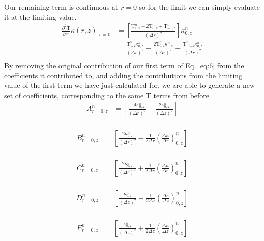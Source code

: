 \documentclass[12pt]{article}
\begin{document}
      Our remaining term is continuous at $r=0$ so for the limit we can simply evaluate it at the limiting value.
      \begin{equation}
        \begin{aligned}
          \frac{\partial^2\mathrm{T}}{\partial r^2}\kappa(r, z)\rvert_{r=0} &= \left [\frac{\mathrm{T}^{n}_{1, z}  - 2 \mathrm{T}^{n}_{0, z} +  \mathrm{T}^{n}_{-1, z}}{(\Delta r)^2} \right ] \kappa^n_{0, z} \\
           &= \frac{\mathrm{T}^n_{1, z}\kappa^n_{0, z}}{(\Delta r)^2} - \frac{2 \mathrm{T}^n_{0, z}\kappa^n_{0,z}}{(\Delta r)^2} + \frac{\mathrm{T}^n_{- 1, z}\kappa^n_{0,z}}{(\Delta r)^2}\\
        \end{aligned}
      \end{equation}
    By removing the original contribution of our first term of Eq. \ref{eq:6} from the coefficients it contributed to, and adding the contributions from the limiting value of the first term we have just calculated for, we are able to generate a new set of coefficients, corresponding to the same $\mathrm{T}$ terms from before
		\begin{equation}
      \begin{aligned}
        A^n_{r=0, z} &= \left [\frac{-4\kappa^n_{0, z}}{(\Delta r)^2} -\frac{2\kappa^n_{0, z}}{(\Delta z)^2}  \right ] \\
      \end{aligned}
		\end{equation}

		\begin{equation}
      \begin{aligned}
        B^n_{r=0, z} &= \left [\frac{2\kappa^n_{0, z}}{(\Delta r)^2} - \frac{1}{2\Delta r}(\frac{\Delta\kappa}{\Delta r})^n_{0, z} \right ] \\
      \end{aligned}
		\end{equation}

		
		\begin{equation}
      \begin{aligned}
        C^n_{r=0, z} &= \left [\frac{2\kappa^n_{0, z}}{(\Delta r)^2} + \frac{1}{2\Delta r}(\frac{\Delta\kappa}{\Delta r})^n_{0, z} \right ] \\
      \end{aligned}
		\end{equation}
		
		\begin{equation}
      \begin{aligned}
        D^n_{r=0, z} &= \left [\frac{\kappa^n_{0, z}}{(\Delta z)^2} - \frac{1}{2\Delta z}(\frac{\Delta\kappa}{\Delta z})^n_{0, z}  \right ] \\
      \end{aligned}
		\end{equation}
		
		\begin{equation}
      \begin{aligned}
        E^n_{r=0, z} &= \left [ \frac{\kappa^n_{0, z}}{(\Delta z)^2} + \frac{1}{2\Delta z}(\frac{\Delta\kappa}{\Delta z})^n_{0, z} \right ] \\
      \end{aligned}
		\end{equation}
\end{document}
